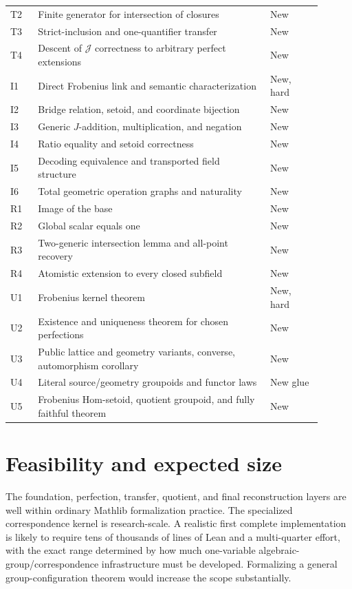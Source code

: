 \documentclass[11pt,oneside]{article}
\theoremstyle{definition}
\theoremstyle{remark}
\newcommand{\Jrel}{\mathcal{J}}
\begin{document}
\begin{longtable}{p{0.08\linewidth}p{0.67\linewidth}p{0.15\linewidth}}
T2 & Finite generator for intersection of closures & New\\
T3 & Strict-inclusion and one-quantifier transfer & New\\
T4 & Descent of $\Jrel$ correctness to arbitrary perfect extensions & New\\
I1 & Direct Frobenius link and semantic characterization & New, hard\\
I2 & Bridge relation, setoid, and coordinate bijection & New\\
I3 & Generic $J$-addition, multiplication, and negation & New\\
I4 & Ratio equality and setoid correctness & New\\
I5 & Decoding equivalence and transported field structure & New\\
I6 & Total geometric operation graphs and naturality & New\\
R1 & Image of the base & New\\
R2 & Global scalar equals one & New\\
R3 & Two-generic intersection lemma and all-point recovery & New\\
R4 & Atomistic extension to every closed subfield & New\\
U1 & Frobenius kernel theorem & New, hard\\
U2 & Existence and uniqueness theorem for chosen perfections & New\\
U3 & Public lattice and geometry variants, converse, automorphism corollary & New\\
U4 & Literal source/geometry groupoids and functor laws & New glue\\
U5 & Frobenius Hom-setoid, quotient groupoid, and fully faithful theorem & New\\
\bottomrule
\end{longtable}

\section{Feasibility and expected size}

The foundation, perfection, transfer, quotient, and final reconstruction layers are
well within ordinary Mathlib formalization practice.  The specialized correspondence
kernel is research-scale.  A realistic first complete implementation is likely to require
tens of thousands of lines of Lean and a multi-quarter effort, with the exact range
determined by how much one-variable algebraic-group/correspondence infrastructure must be
developed.  Formalizing a general group-configuration theorem would increase the scope
substantially.
\end{document}
